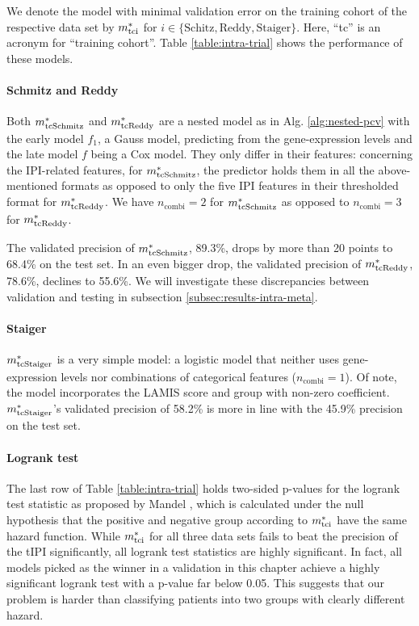 We denote the model with minimal validation error on the training cohort of the respective data set 
by $m^*_\text{tci}$ for $i \in \{\text{Schitz}, \text{Reddy}, \text{Staiger}\}$.  Here, ``tc'' is an 
acronym for ``training cohort''. Table \ref{table:intra-trial} shows the performance of these models.

\paragraph{Schmitz and Reddy}
Both $m^*_\text{tcSchmitz}$ and $m^*_\text{tcReddy}$ are a nested 
model as in Alg. \ref{alg:nested-pcv} with the early model $f_1$, a Gauss model, predicting from 
the gene-expression levels and the late model $f$ being a Cox model. They only differ in their 
features: concerning the IPI-related features, for $m^*_\text{tcSchmitz}$, the predictor holds them in
all the above-mentioned formats as opposed to only the five IPI features in their thresholded 
format for 
$m^*_\text{tcReddy}$. We have $n_\text{combi} = 2$ for $m^*_\text{tcSchmitz}$ as opposed to $n_\text{combi} = 3$ 
for $m^*_\text{tcReddy}$.

The validated precision of $m^*_\text{tcSchmitz}$, \num{89.3}\%, drops by more than \num{20} points 
to \num{68.4}\% on the test set. In an even bigger drop, the validated precision of $m^*_\text{tcReddy}$,
\num{78.6}\%, declines to \num{55.6}\%. We will investigate these discrepancies between 
validation and testing in subsection \ref{subsec:results-intra-meta}.

\paragraph{Staiger}
$m^*_\text{tcStaiger}$ is a very simple model: a logistic model that neither uses 
gene-expression levels nor combinations of categorical features ($n_\text{combi} = 1$). Of note, the 
model incorporates the LAMIS score and group with non-zero coefficient. $m^*_\text{tcStaiger}$'s 
validated precision of \num{58.2}\% is more in line with the \num{45.9}\% precision on the test set.

\paragraph{Logrank test}
The last row of Table \ref{table:intra-trial} holds two-sided p-values for the logrank test
statistic as proposed by Mandel \cite{mantel66}, which is calculated under the null hypothesis 
that the positive and negative group according to $m^*_\text{tci}$ have the same hazard function. While 
$m^*_\text{tci}$ for all three data sets fails to beat the precision of the tIPI significantly, all logrank 
test statistics are highly significant. In fact, all models picked as the winner in a validation in this 
chapter achieve a highly significant logrank test with a p-value far below \num{0.05}. 
This suggests that our problem is harder than classifying patients into two groups with clearly 
different hazard. 

